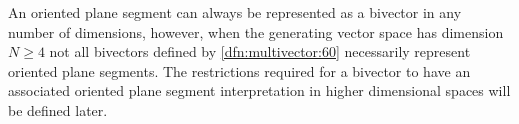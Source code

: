 
%
An oriented plane segment can always be represented as a bivector in any number of dimensions, however, when the generating vector space has dimension \( N \ge 4 \) not all bivectors defined by \cref{dfn:multivector:60} necessarily represent oriented plane segments.
The restrictions required for a bivector to have an associated oriented plane segment interpretation in higher dimensional spaces will be defined later.

